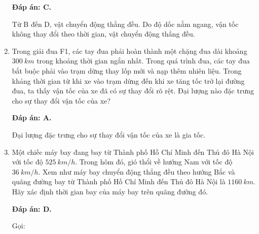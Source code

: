 \begin{enumerate}[label=\bfseries Câu \arabic*:]
{	}
	
	\hideall
	{\textbf{Đáp án: C.}
		
		Từ B đến D, vật chuyển động thẳng đều. Do độ dốc nằm ngang, vận tốc không thay đổi theo thời gian, vật chuyển động thẳng đều.
		
	}
	
	\item {}
	
	
	{Trong giải đua F1, các tay đua phải hoàn thành một chặng đua dài khoảng $\SI{300}{km}$ trong khoảng thời gian ngắn nhất. Trong quá trình đua, các tay đua bắt buộc phải vào trạm dừng thay lốp mới và nạp thêm nhiên liệu. Trong khảng thời gian từ khi xe vào trạm dừng đến khi xe tăng tốc trở lại đường đua, ta thấy vận tốc của xe đã có sự thay đổi rõ rệt. Đại lượng nào đặc trưng cho sự thay đổi vận tốc của xe?
	
		
	}
	
	\hideall
	{\textbf{Đáp án: A.}
		
		Đại lượng đặc trưng cho sự thay đổi vận tốc của xe là gia tốc.
		
	}
	\item {}
	
	
	{Một chiếc máy bay đang bay từ Thành phố Hồ Chí Minh đến Thủ đô Hà Nội với tốc độ $\SI{525}{km/h}$. Trong hôm đó, gió thổi về hướng Nam với tốc độ $\SI{36}{km/h}$. Xem như máy bay chuyển động thẳng đều theo hướng Bắc và quãng đường bay từ Thành phố Hồ Chí Minh đến Thủ đô Hà Nội là $\SI{1160}{km}$. Hãy xác định thời gian bay của máy bay trên quãng đường đó.
	
		
	}
	
	\hideall
	{\textbf{Đáp án: D.}
		
		Gọi:
		
}
\end{enumerate}
